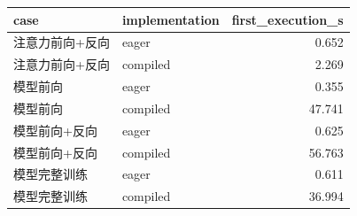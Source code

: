 \begin{tabular}{llr}
\toprule
case & implementation & first\_execution\_s \\
\midrule
注意力前向+反向 & eager & 0.652 \\
注意力前向+反向 & compiled & 2.269 \\
模型前向 & eager & 0.355 \\
模型前向 & compiled & 47.741 \\
模型前向+反向 & eager & 0.625 \\
模型前向+反向 & compiled & 56.763 \\
模型完整训练 & eager & 0.611 \\
模型完整训练 & compiled & 36.994 \\
\bottomrule
\end{tabular}
